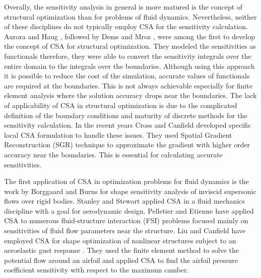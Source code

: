 Overally, the sensitivity analysis in general is more matured is the concept of structural optimization than for problems of fluid dynamics. Nevertheless, neither of these disciplines do not typically employ CSA for the sensitivity calculation. Aurora and Haug \cite{Arora}, followed by Dems and Mroz \cite{Dems-Mroz}, were among the first to develop the concept of CSA for structural optimization. They modeled the sensitivities as functionals therefore, they were able to convert the sensitivity integrals over the entire domain to the integrals over the boundaries. Although using this approach it is possible to reduce the cost of the simulation, accurate values of functionals are required at the boundaries. This is not always achievable especially for finite element analysis where the solution accuracy drops near the boundaries. The lack of applicability of CSA in structural optimization is due to the complicated definition of the boundary conditions and maturity of discrete methods for the sensitivity calculation. In the recent years Cross and Canfield \cite{cross2014local} developed specific local CSA formulation to handle these issues. They used Spatial Gradient Reconstruction (SGR) technique to approximate the gradient with higher order accuracy near the boundaries. This is essential for calculating accurate sensitivities.

The first application of CSA in optimization problems for fluid dynamics is the work by Borggaard and Burns \cite{borggaard1995sensitivity} for shape sensitivity analysis of inviscid supersonic flows over rigid bodies. Stanley and Stewart \cite{stanley2002design} applied CSA in a fluid mechanics discipline with a goal for aerodynamic design. Pelletier and Etienne have applied CSA to numerous fluid-structure interaction (FSI) problems \cite{etienne2005general} focused mainly on sensitivities of fluid flow parameters near the structure. Liu and Canfield have employed CSA for shape optimization of nonlinear structures subject to an aeroelastic gust response \cite{liu2013equivalence}. They used the finite element method to solve the potential flow around an airfoil and applied CSA to find the airfoil pressure coefficient sensitivity with respect to the maximum camber. 

